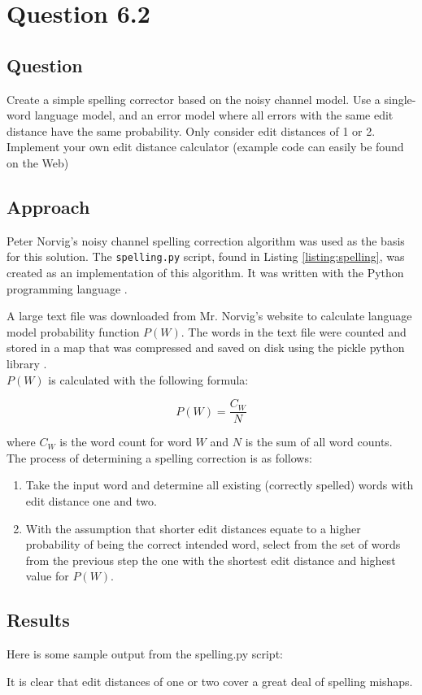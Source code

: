 \section{Question 6.2}

\subsection{Question}
Create a simple spelling corrector based on the noisy channel model. Use a
single-word language model, and an error model where all errors with the same
edit distance have the same probability. Only consider edit distances of 1 or 2.
Implement your own edit distance calculator (example code can easily be found
on the Web)

\subsection{Approach}
Peter Norvig's noisy channel spelling correction algorithm \cite{pnorvig-spell} was used as the basis for this solution.  The \texttt{spelling.py} script, found in Listing \ref{listing:spelling}, was created as an implementation of this algorithm.  It was written with the Python programming language \cite{python}.

A large text file was downloaded from Mr. Norvig's website to calculate language model probability function \(P(W)\).  The words in the text file were counted and stored in a map that was compressed and saved on disk using the pickle python library \cite{py:pickle}.\\

\(P(W)\) is calculated with the following formula:

\[P(W) = \frac{C_W}{N}\]

where \(C_W\) is the word count for word \(W\) and \(N\) is the sum of all word counts.\\

The process of determining a spelling correction is as follows:

\begin{enumerate}
    \item Take the input word and determine all existing (correctly spelled) words with edit distance one and two.
    \item With the assumption that shorter edit distances equate to a higher probability of being the correct intended word, select from the set of words from the previous step the one with the shortest edit distance and highest value for \(P(W)\).
\end{enumerate}

\subsection{Results}
Here is some sample output from the spelling.py script:



It is clear that edit distances of one or two cover a great deal of spelling mishaps.